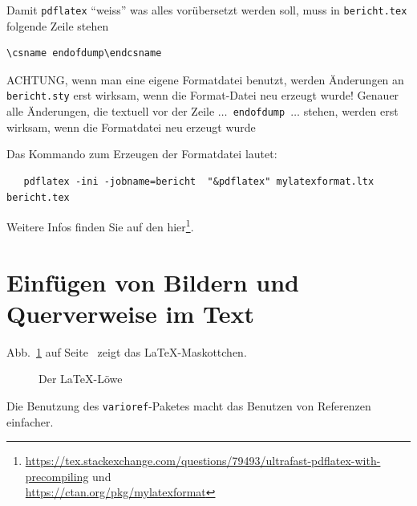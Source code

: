 Damit \texttt{pdflatex} \enquote{weiss} was alles vorübersetzt werden soll, muss in
\texttt{bericht.tex} folgende Zeile stehen
\begin{verbatim}
\csname endofdump\endcsname
\end{verbatim}
ACHTUNG, wenn man eine eigene Formatdatei benutzt, werden Änderungen an \texttt{bericht.sty}
erst wirksam, wenn die Format-Datei neu erzeugt wurde!
Genauer alle Änderungen, die textuell vor  der Zeile \texttt{$\dots$ endofdump $\dots$} stehen,
werden erst wirksam, wenn die Formatdatei neu erzeugt wurde

Das Kommando zum Erzeugen der Formatdatei lautet:
\begin{verbatim}
   pdflatex -ini -jobname=bericht  "&pdflatex" mylatexformat.ltx bericht.tex
\end{verbatim}
Weitere Infos finden Sie auf den hier\footnote{
\url{https://tex.stackexchange.com/questions/79493/ultrafast-pdflatex-with-precompiling} und\\
\url{https://ctan.org/pkg/mylatexformat}}.


\section{Einfügen von Bildern und Querverweise im Text}


Abb.~\ref{fig-loewe} auf Seite~\pageref{fig-loewe} zeigt das \LaTeX-Maskottchen.
\begin{figure}[htbp]
\centering
{}
\caption{\label{fig-loewe}Der \LaTeX-Löwe}
\end{figure}

Die Benutzung des \texttt{varioref}-Paketes macht das Benutzen von Referenzen einfacher.


